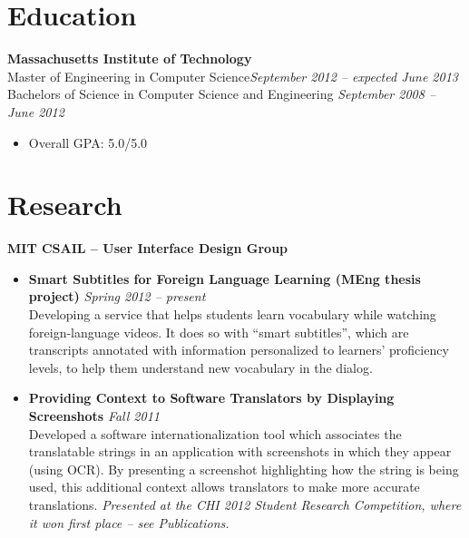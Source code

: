 \documentclass[margin,line]{resume}
\begin{document}
\vspace{-5.0mm}

\begin{resume}

\section{\mysidestyle Education}

\textbf{Massachusetts Institute of Technology} \vspace{0mm}\\\vspace{0mm}%
Master of Engineering in Computer Science\hfill \textsl{September 2012 -- expected June 2013}\\\vspace{1mm}%
Bachelors of Science in Computer Science and Engineering \hfill \textsl{September 2008 -- June 2012}\vspace{-0.8mm}
\begin{itemize}
\item Overall GPA: 5.0/5.0 \\
\end{itemize}

\vspace{-6.5mm}

\section{\mysidestyle Research}

\textbf{MIT CSAIL -- User Interface Design Group}
\begin{itemize}
\item \textbf{Smart Subtitles for Foreign Language Learning (MEng thesis project)}  \hfill \textsl{Spring 2012 -- present} \\
Developing a service that helps students learn vocabulary while watching foreign-language videos.
It does so with ``smart subtitles'', which are transcripts annotated with information personalized to learners' proficiency levels, to help them understand new vocabulary in the dialog. %
\item \textbf{Providing Context to Software Translators by Displaying Screenshots}  \hfill \textsl{Fall 2011}\\
Developed a software internationalization tool which associates the translatable strings in an application with screenshots in which they appear (using OCR). By presenting a screenshot highlighting how the string is being used, this additional context allows translators to make more accurate translations.
\textit{Presented at the CHI 2012 Student Research Competition, where it won first place -- see Publications.}
\end{itemize}


\end{resume}
\end{document}
